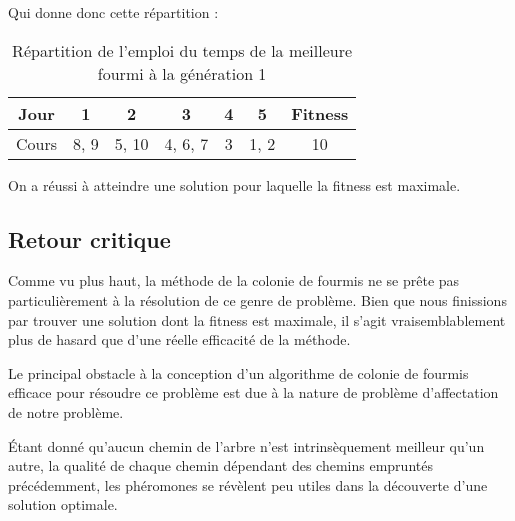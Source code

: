 Qui donne donc cette répartition :

\begin{table}[!h]
    \centering
    \begin{tabular}{|c|c|c|c|c|c|c|}
        \hline
        Jour  & 1    & 2     & 3       & 4 & 5    & Fitness \\
        \hline
        Cours & 8, 9 & 5, 10 & 4, 6, 7 & 3 & 1, 2 & 10      \\
        \hline
    \end{tabular}
    \caption{Répartition de l'emploi du temps de la meilleure fourmi à la génération 1}\label{tab:fourmi-finale}
\end{table}

On a réussi à atteindre une solution pour laquelle la fitness est maximale.

\newpage
\subsection{Retour critique}\label{subsec:retour-critique}

Comme vu plus haut, la méthode de la colonie de fourmis ne se prête pas particulièrement à la résolution de ce genre de problème.
Bien que nous finissions par trouver une solution dont la fitness est maximale, il s'agit vraisemblablement plus de hasard que d'une réelle efficacité de la méthode.

Le principal obstacle à la conception d'un algorithme de colonie de fourmis efficace pour résoudre ce problème est due à la nature de problème d'affectation de notre problème.

Étant donné qu'aucun \og chemin \fg{} de l'arbre n'est intrinsèquement meilleur qu'un autre, la qualité de chaque chemin dépendant des chemins empruntés précédemment, les phéromones se révèlent peu utiles dans la découverte d'une solution optimale.